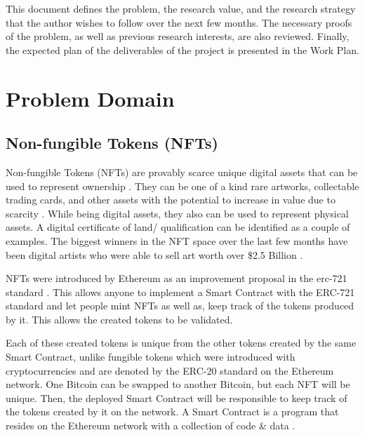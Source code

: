 \documentclass[a4paper, 12pt, oneside]{report}
\begin{document}
This document defines the problem, the research value, and the research strategy that the author wishes to follow over the next few months. The necessary proofs of the problem, as well as previous research interests, are also reviewed. Finally, the expected plan of the deliverables of the project is presented in the Work Plan.


\begingroup
\let\clearpage\relax


\chapter{Problem Domain}
\section{Non-fungible Tokens (NFTs)}
Non-fungible Tokens (NFTs) are provably scarce unique digital assets that can be used to represent ownership \autocite{noauthor_erc-721_nodate}.
They can be one of a kind rare artworks, collectable trading cards, and other assets with the potential to increase in value due to scarcity \autocite{conti_what_2021, fairfield_tokenized_2021}. While being digital assets, they also can be used to represent physical assets. A digital certificate of land/ qualification can be identified as a couple of examples. The biggest winners in the NFT space over the last few months have been digital artists who were able to sell art worth over \$2.5 Billion \parencite{noauthor_off_2021}.


NFTs were introduced by Ethereum \autocite{wood_ethereum_2014} as an improvement proposal \autocite{noauthor_eip-2309_nodate, noauthor_erc_nodate} in the \gls{erc}-721 standard \autocite{noauthor_erc-721_nodate}. This allows anyone to implement a Smart Contract with the ERC-721 standard and let people mint NFTs as well as, keep track of the tokens produced by it. This allows the created tokens to be validated.

Each of these created tokens is unique from the other tokens created by the same Smart Contract, unlike fungible tokens which were introduced with cryptocurrencies and are denoted by the ERC-20 standard \autocite{noauthor_erc-20_nodate} on the Ethereum network. One Bitcoin can be swapped to another Bitcoin, but each NFT will be unique.
Then, the deployed Smart Contract will be responsible to keep track of the tokens created by it on the network. A Smart Contract is a program that resides on the Ethereum network with a collection of code \& data \autocite{noauthor_introduction_nodate}.
\end{document}
